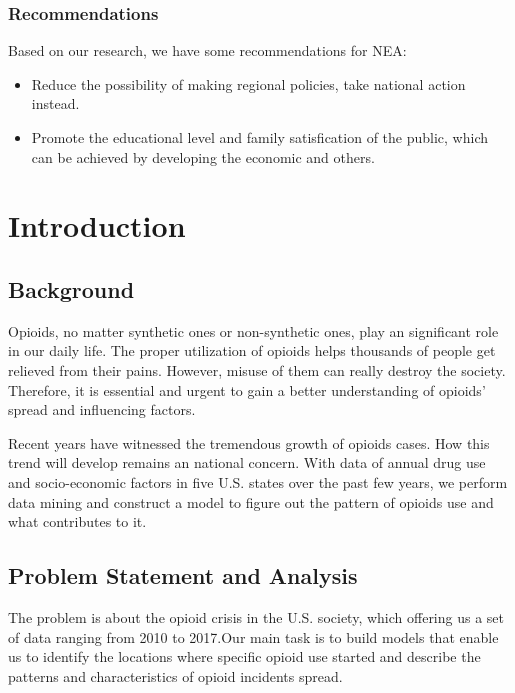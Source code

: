 \documentclass[12pt]{article}
\begin{document}
\subsubsection*{Recommendations}
Based on our research, we have some recommendations for NEA:
\begin{itemize}
	\item Reduce the possibility of making regional policies, take national action instead.
	\item Promote the educational level and family satisfication of the public, which can be achieved by developing the economic and others.
\end{itemize}
\newpage

\section{Introduction}
\subsection{Background}
Opioids, no matter synthetic ones or non-synthetic ones, play an significant role in our daily life. The proper utilization of opioids helps thousands of people get relieved from their pains. However, misuse of them can really destroy the society. Therefore, it is essential and urgent to gain a better understanding of opioids' spread and influencing factors.

Recent years have witnessed the tremendous growth of opioids cases. How this trend will develop remains an national concern. With data of annual drug use and socio-economic factors in five U.S. states over the past few years, we perform data mining and construct a model to figure out the pattern of opioids use and what contributes to it.

\subsection{Problem Statement and Analysis}
The problem is about the opioid crisis in the U.S. society, which offering us a set of data ranging from 2010 to 2017.Our main task is to build models that enable us to identify the locations where specific opioid use started and describe the patterns and characteristics of opioid incidents spread. 
\end{document}
